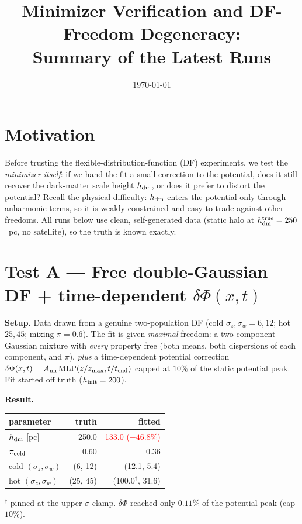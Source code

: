 \documentclass[11pt]{article}
\title{\vspace{-1.5em}Minimizer Verification and DF-Freedom Degeneracy:\\
\large Summary of the Latest Runs}
\author{}
\date{\today}
\newcommand{\hdm}{h_{\rm dm}}
\begin{document}
\maketitle
\vspace{-3em}

\section*{Motivation}
Before trusting the flexible-distribution-function (DF) experiments, we test the
\emph{minimizer itself}: if we hand the fit a small correction to the potential,
does it still recover the dark-matter scale height $\hdm$, or does it prefer to
distort the potential? Recall the physical difficulty: $\hdm$ enters the potential
only through anharmonic terms, so it is weakly constrained and easy to trade
against other freedoms. All runs below use clean, self-generated data (static
halo at $\hdm^{\rm true}=250$~pc, no satellite), so the truth is known exactly.

\section{Test A --- Free double-Gaussian DF + time-dependent $\delta\Phi(x,t)$}

\textbf{Setup.} Data drawn from a genuine two-population DF (cold
$\sigma_z,\sigma_w=6,12$; hot $25,45$; mixing $\pi=0.6$). The fit is given
\emph{maximal} freedom: a two-component Gaussian mixture with \emph{every}
property free (both means, both dispersions of each component, and $\pi$),
\emph{plus} a time-dependent potential correction
$\delta\Phi(x,t)=A_{\rm nn}\,\mathrm{MLP}(z/z_{\max},t/t_{\rm end})$ capped at
$10\%$ of the static potential peak. Fit started off truth ($h_{\rm init}=200$).

\textbf{Result.}
\begin{center}
\begin{tabular}{lrr}
\toprule
parameter & truth & fitted \\
\midrule
$\hdm$ [pc]      & 250.0 & \textcolor{red}{133.0 \;($-46.8\%$)} \\
$\pi_{\rm cold}$ & 0.60  & 0.36 \\
cold $(\sigma_z,\sigma_w)$ & (6, 12) & (12.1, 5.4) \\
hot $(\sigma_z,\sigma_w)$  & (25, 45)& (100.0$^\dagger$, 31.6) \\
\bottomrule
\end{tabular}
\end{center}
{\small $^\dagger$ pinned at the upper $\sigma$ clamp.} \;
$\delta\Phi$ reached only $0.11\%$ of the potential peak (cap $10\%$).
\end{document}
